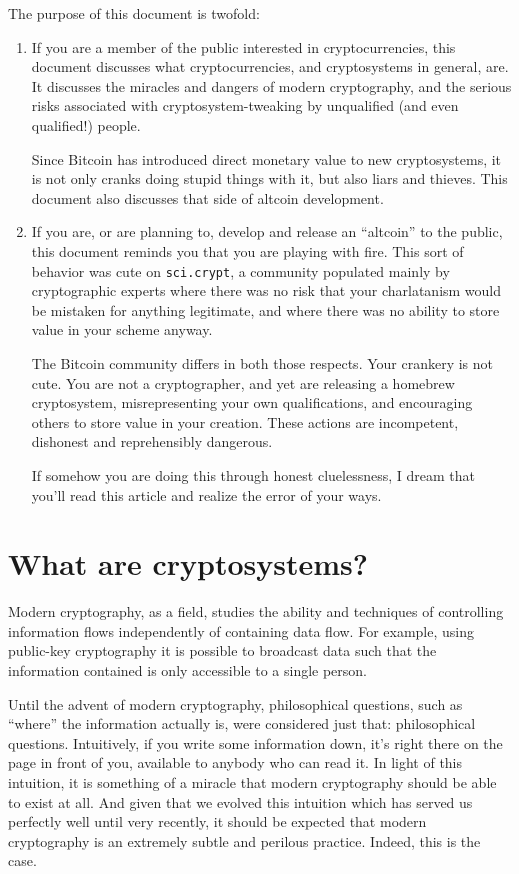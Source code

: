 \documentclass[letterpaper]{article}
\begin{document}
The purpose of this document is twofold:
\begin{enumerate}
\item If you are a member of the public interested in cryptocurrencies,
this document discusses what cryptocurrencies, and cryptosystems in general,
are. It discusses the miracles and dangers of modern cryptography, and
the serious risks associated with cryptosystem-tweaking by unqualified
(and even qualified!) people.

Since Bitcoin has introduced direct monetary value to new cryptosystems,
it is not only cranks doing stupid things with it, but also liars and
thieves. This document also discusses that side of altcoin development.
\item If you are, or are planning to, develop and release an ``altcoin''
to the public, this document reminds you that you are playing with fire.
This sort of behavior was cute on \texttt{sci.crypt}, a community populated
mainly by cryptographic experts where there was no risk that your charlatanism
would be mistaken for anything legitimate, and where there was no ability to
store value in your scheme anyway.

The Bitcoin community differs in both those respects. Your crankery is
not cute. You are not a cryptographer, and yet are releasing a homebrew
cryptosystem, misrepresenting your own qualifications, and encouraging
others to store value in your creation. These actions are incompetent,
dishonest and reprehensibly dangerous.

If somehow you are doing this through honest cluelessness, I dream that
you'll read this article and realize the error of your ways.
\end{enumerate}

\section{What are cryptosystems?}

Modern cryptography, as a field, studies the ability and techniques of
controlling information flows independently of containing data flow.
For example, using public-key cryptography it is possible to broadcast
data such that the information contained is only accessible to a single
person.

Until the advent of modern cryptography, philosophical questions, such
as ``where'' the information actually is, were considered just that:
philosophical questions. Intuitively, if you write some information
down, it's right there on the page in front of you, available to anybody
who can read it. In light of this intuition, it is something of a miracle
that modern cryptography should be able to exist at all. And given that
we evolved this intuition which has served us perfectly well until very
recently, it should be expected that modern cryptography is an extremely
subtle and perilous practice. Indeed, this is the case.
\end{document}
